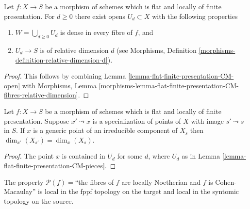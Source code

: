 \begin{lemma}
\label{lemma-flat-finite-presentation-CM-pieces}
Let $f : X \to S$ be a morphism of schemes which is flat and locally
of finite presentation. For $d \geq 0$ there exist opens $U_d \subset X$
with the following properties
\begin{enumerate}
\item $W = \bigcup_{d \geq 0} U_d$ is dense in every fibre of $f$, and
\item $U_d \to S$ is of relative dimension $d$ (see
Morphisms, Definition \ref{morphisms-definition-relative-dimension-d}).
\end{enumerate}
\end{lemma}

\begin{proof}
This follows by combining
Lemma \ref{lemma-flat-finite-presentation-CM-open}
with
Morphisms, Lemma
\ref{morphisms-lemma-flat-finite-presentation-CM-fibres-relative-dimension}.
\end{proof}

\begin{lemma}
\label{lemma-flat-finite-presentation-specialization-dimension}
Let $f : X \to S$ be a morphism of schemes which is flat and locally
of finite presentation.
Suppose $x' \leadsto x$ is a specialization of points of $X$
with image $s' \leadsto s$ in $S$. If $x$ is a generic point of an
irreducible component of $X_s$ then $\dim_{x'}(X_{s'}) = \dim_x(X_s)$.
\end{lemma}

\begin{proof}
The point $x$ is contained in $U_d$ for some $d$, where $U_d$ as in
Lemma \ref{lemma-flat-finite-presentation-CM-pieces}.
\end{proof}

\begin{lemma}
\label{lemma-CM-local-source-and-target}
The property
$\mathcal{P}(f)=$``the fibres of $f$ are locally Noetherian and $f$ is
Cohen-Macaulay'' is local in the fppf topology on the target and
local in the syntomic topology on the source.
\end{lemma}

